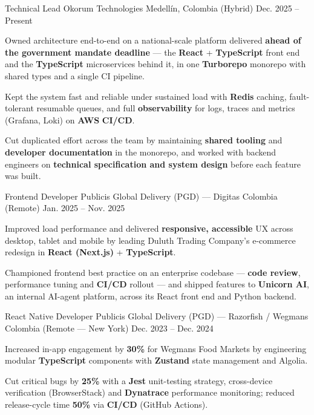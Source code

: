 \newcommand{\quotes}[1]{``#1''}

\begin{cventries}

  \cventry
  {Technical Lead}
  {Okorum Technologies}
  {Medellín, Colombia (Hybrid)}
  {Dec. 2025 -- Present}
  {
    \begin{cvitems}
      \item {Owned architecture end-to-end on a national-scale platform delivered \textbf{ahead of the government mandate deadline} --- the \textbf{React} + \textbf{TypeScript} front end and the \textbf{TypeScript} microservices behind it, in one \textbf{Turborepo} monorepo with shared types and a single CI pipeline.}
      \item {Kept the system fast and reliable under sustained load with \textbf{Redis} caching, fault-tolerant resumable queues, and full \textbf{observability} for logs, traces and metrics (Grafana, Loki) on \textbf{AWS} \textbf{CI/CD}.}
      \item {Cut duplicated effort across the team by maintaining \textbf{shared tooling} and \textbf{developer documentation} in the monorepo, and worked with backend engineers on \textbf{technical specification and system design} before each feature was built.}
    \end{cvitems}
  }

  \cventry
  {Frontend Developer}
  {Publicis Global Delivery (PGD) — Digitas}
  {Colombia (Remote)}
  {Jan. 2025 -- Nov. 2025}
  {
    \begin{cvitems}
      \item {Improved load performance and delivered \textbf{responsive, accessible} UX across desktop, tablet and mobile by leading Duluth Trading Company's e-commerce redesign in \textbf{React (Next.js)} + \textbf{TypeScript}.}
      \item {Championed frontend best practice on an enterprise codebase --- \textbf{code review}, performance tuning and \textbf{CI/CD} rollout --- and shipped features to \textbf{Unicorn AI}, an internal AI-agent platform, across its React front end and Python backend.}
    \end{cvitems}
  }

  \cventry
  {React Native Developer}
  {Publicis Global Delivery (PGD) — Razorfish / Wegmans}
  {Colombia (Remote — New York)}
  {Dec. 2023 -- Dec. 2024}
  {
    \begin{cvitems}
      \item {Increased in-app engagement by \textbf{30\%} for Wegmans Food Markets by engineering modular \textbf{TypeScript} components with \textbf{Zustand} state management and Algolia.}
      \item {Cut critical bugs by \textbf{25\%} with a \textbf{Jest} unit-testing strategy, cross-device verification (BrowserStack) and \textbf{Dynatrace} performance monitoring; reduced release-cycle time \textbf{50\%} via \textbf{CI/CD} (GitHub Actions).}
    \end{cvitems}
  }


\end{cventries}
